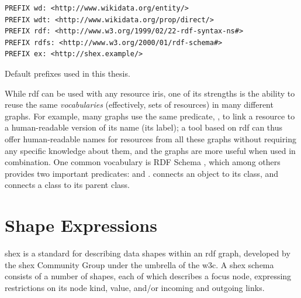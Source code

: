 \begin{lstfloat}
\begin{lstlisting}[language=sparql]
PREFIX wd: <http://www.wikidata.org/entity/>
PREFIX wdt: <http://www.wikidata.org/prop/direct/>
PREFIX rdf: <http://www.w3.org/1999/02/22-rdf-syntax-ns#>
PREFIX rdfs: <http://www.w3.org/2000/01/rdf-schema#>
PREFIX ex: <http://shex.example/>
\end{lstlisting}
\caption{Default prefixes used in this thesis.}
\label{listing:prefixes}
\end{lstfloat}

While \gls{rdf} can be used with any \gls{resource} \glspl{iri},
one of its strengths is the ability to reuse the same \emph{vocabularies}
(effectively, sets of \glspl{resource})
in many different graphs.
For example, many graphs use the same \gls{predicate}, ,
to link a \gls{resource} to a human-readable version of its name (its label);
a tool based on \gls{rdf} can thus offer human-readable names for \glspl{resource} from all these graphs
without requiring any specific knowledge about them,
and the graphs are more useful when used in combination.
One common vocabulary is RDF Schema \cite{Guha:14:RS}, %
which among others provides two important predicates:
 and .
 connects an object to its class,
and  connects a class to its parent class.


\section{Shape Expressions}
\label{sec:Background:ShEx}


\acrfull{shex} \cite{shex}
is a standard for describing data shapes within an \gls{rdf} graph,
developed by the \gls{shex} Community Group under the umbrella of the \gls{w3c}.
A \gls{shex} \gls{schema} consists of a number of \glspl{shape},
each of which describes a focus node,
expressing restrictions on its node kind, value, and/or incoming and outgoing links.

